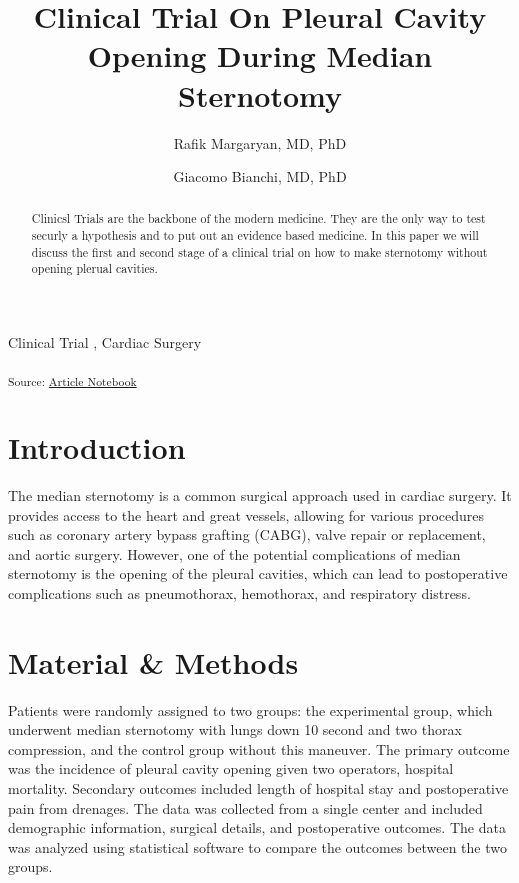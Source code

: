 \documentclass[
  number]{elsarticle}
\begin{document}
\begin{frontmatter}
\title{Clinical Trial On Pleural Cavity Opening During Median
Sternotomy}
\author[1]{Rafik Margaryan, MD, PhD%
%
}
\author[2]{Giacomo Bianchi, MD, PhD%
%
}





        
\begin{abstract}
Clinicsl Trials are the backbone of the modern medicine. They are the
only way to test securly a hypothesis and to put out an evidence based
medicine. In this paper we will discuss the first and second stage of a
clinical trial on how to make sternotomy without opening plerual
cavities.
\end{abstract}





\begin{keyword}
    Clinical Trial \sep 
    Cardiac Surgery
\end{keyword}
\end{frontmatter}
    

\textsubscript{Source:
\href{https://raffdoc.github.io/manuscript-template/index.qmd.html}{Article
Notebook}}

\section{Introduction}\label{introduction}

The median sternotomy is a common surgical approach used in cardiac
surgery. It provides access to the heart and great vessels, allowing for
various procedures such as coronary artery bypass grafting (CABG), valve
repair or replacement, and aortic surgery\citep{angelini1989}. However,
one of the potential complications of median sternotomy is the opening
of the pleural cavities, which can lead to postoperative complications
such as pneumothorax, hemothorax, and respiratory distress.

\section{Material \& Methods}\label{sec-data-methods}

Patients were randomly assigned to two groups: the experimental group,
which underwent median sternotomy with lungs down 10 second and two
thorax compression, and the control group without this maneuver. The
primary outcome was the incidence of pleural cavity opening given two
operators, hospital mortality. Secondary outcomes included length of
hospital stay and postoperative pain from drenages. The data was
collected from a single center and included demographic information,
surgical details, and postoperative outcomes. The data was analyzed
using statistical software to compare the outcomes between the two
groups.
\end{document}
